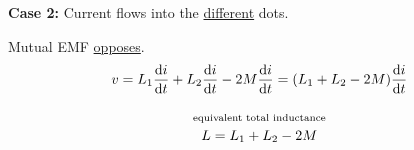 \begin{multicols}{2}
{        \textbf{Case 2:} Current flows into the \ul{different} dots. \\[0mm]
         

         Mutual EMF \ul{opposes}.
        \begin{gather*}
            v
                = L_1 \frac{\diff{i}}{\diff{t}} + L_2 \frac{\diff{i}}{\diff{t}} - 2M \frac{\diff{i}}{\diff{t}}
                = \parens*{L_1 + L_2 - 2M} \frac{\diff{i}}{\diff{t}} \\[\abovedisplayskip]
            \MathOverLabel{\text{equivalent total inductance}}{L = L_1 + L_2 - 2M}
        \end{gather*}


    }

\end{multicols}

